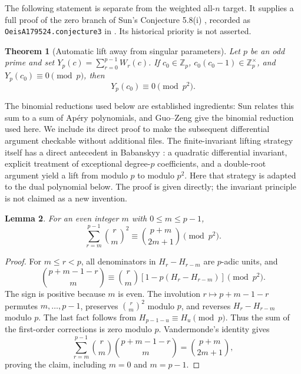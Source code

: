 \documentclass[11pt,a4paper]{article}
\newtheorem{theorem}{Theorem}[section]
\newtheorem{lemma}[theorem]{Lemma}
\theoremstyle{remark}\newtheorem{remark}[theorem]{Remark}
\newcommand{\Z}{\mathbb Z}
\begin{document}
The following statement is separate from the weighted all-\(n\) target.
It supplies a full proof of the zero branch of Sun's Conjecture 5.8(i)
\cite{Sun2010}, recorded as \texttt{OeisA179524.conjecture3} in
\cite{Formal}. Its historical priority is not asserted.

\begin{theorem}[Automatic lift away from singular parameters]\label{zerolift}
Let \(p\) be an odd prime and set
\(Y_p(c)=\sum_{r=0}^{p-1}W_r(c)\). If \(c_0\in\Z_p\),
\(c_0(c_0-1)\in\Z_p^\times\), and \(Y_p(c_0)\equiv0\pmod p\), then
\[
                         Y_p(c_0)\equiv0\pmod {p^2}.
\]
\end{theorem}

The binomial reductions used below are established ingredients:
Sun \cite[Theorem 1.1]{SunApery} relates this sum to a sum of Ap\'ery
polynomials, and Guo--Zeng \cite[Theorem 1.3]{GuoZeng} give the
binomial reduction used here. We include its direct proof to make the
subsequent differential argument checkable without additional files.
The finite-invariant lifting strategy itself has a direct antecedent in
Babanskyy \cite[Lemmas 2.1--2.2]{Babanskyy}: a quadratic differential
invariant, explicit treatment of exceptional degree-\(p\) coefficients,
and a double-root argument yield a lift from modulo \(p\) to modulo
\(p^2\). Here that strategy is adapted to the dual polynomial below.
The proof is given directly; the invariant principle is not claimed
as a new invention.

\begin{lemma}\label{vandermonde}
For an even integer \(m\) with \(0\le m\le p-1\),
\[
 \sum_{r=m}^{p-1}\binom rm^2
                \equiv\binom{p+m}{2m+1}\pmod {p^2}.
\]
\end{lemma}
\begin{proof}
For \(m\le r<p\), all denominators in \(H_r-H_{r-m}\) are \(p\)-adic
units, and
\[
 \binom{p+m-1-r}{m}\equiv
 \binom rm[1-p(H_r-H_{r-m})]\pmod {p^2}.
\]
The sign is positive because \(m\) is even.
The involution \(r\mapsto p+m-1-r\) permutes \(m,\ldots,p-1\),
preserves \(\binom rm^2\) modulo \(p\), and reverses
\(H_r-H_{r-m}\) modulo \(p\). The last fact follows from
\(H_{p-1-u}\equiv H_u\pmod p\). Thus the sum of the first-order
corrections is zero modulo \(p\).
Vandermonde's identity gives
\[
 \sum_{r=m}^{p-1}\binom rm\binom{p+m-1-r}{m}
                  =\binom{p+m}{2m+1},
\]
proving the claim, including \(m=0\) and \(m=p-1\).
\end{proof}
\end{document}
